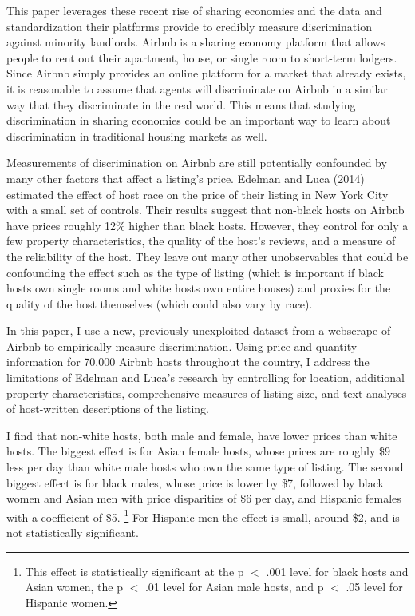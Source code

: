 This paper leverages these recent rise of sharing economies and the data and standardization their platforms provide to credibly measure discrimination against minority landlords. Airbnb is a sharing economy platform that allows people to rent out their apartment, house, or single room to short-term lodgers. Since Airbnb simply provides an online platform for a market that already exists, it is reasonable to assume that agents will discriminate on Airbnb in a similar way that they discriminate in the real world. This means that studying discrimination in sharing economies could be an important way to learn about discrimination in traditional housing markets as well.

Measurements of discrimination on Airbnb are still potentially confounded by many other factors that affect a listing's price. Edelman and Luca (2014) estimated the effect of host race on the price of their listing in New York City with a small set of controls. Their results suggest that non-black hosts on Airbnb have prices roughly 12\% higher than black hosts. However, they control for only a few property characteristics, the quality of the host's reviews, and a measure of the reliability of the host. They leave out many other unobservables that could be confounding the effect such as the type of listing (which is important if black hosts own single rooms and white hosts own entire houses) and proxies for the quality of the host themselves (which could also vary by race). 

In this paper, I use a new, previously unexploited dataset from a webscrape of Airbnb to empirically measure discrimination. Using price and quantity information for 70,000 Airbnb hosts throughout the country, I address the limitations of Edelman and Luca's research by controlling for location, additional property characteristics, comprehensive measures of listing size, and text analyses of host-written descriptions of the listing. 

I find that non-white hosts, both male and female, have lower prices than white hosts. The biggest effect is for Asian female hosts, whose prices are roughly \$9 less per day than white male hosts who own the same type of listing. The second biggest effect is for black males, whose price is lower by \$7, followed by black women and Asian men with price disparities of \$6 per day, and Hispanic females with a coefficient of \$5.%
	\footnote{This effect is statistically significant at the p $<$ .001 level for black hosts and Asian women, the p $<$ .01 level for Asian male hosts, and p $<$ .05 level for Hispanic women.} 
For Hispanic men the effect is small, around \$2, and is not statistically significant. 

